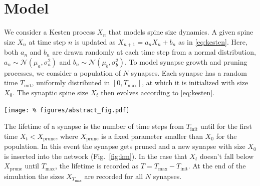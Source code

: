 
\section*{Model}
\vspace{-0.2cm}

We consider a Kesten process $X_n$ that models spine size dynamics. A given spine size $X_n$ at time step $n$ is updated as $X_{n+1} = a_n X_n + b_n$ as in \eqref{eq:kesten}. Here, both $a_n$ and $b_n$ are drawn randomly at each time step from a normal distribution, $a_n \sim \mathcal{N}(\mu_a, \sigma_a^2)$ and $b_n \sim \mathcal{N}(\mu_b, \sigma_b^2)$. To model synapse growth and pruning processes, we consider a population of $N$ synapses. Each synapse has a random time $T_{\mathrm{init}}$, uniformly distributed in $[0,T_{\text{max}}]$, at which it is initialized with size $X_0$. The synaptic spine size $X_t$ then evolves according to \eqref{eq:kesten}.

\begin{minipage}{\columnwidth}
  \begin{center}
    \vspace{0.75cm}
  \texttt{[image: \%
    figures/abstract\_fig.pdf]}
  \label{fig:km}
\end{center}
\end{minipage}

\columnbreak
The lifetime of a synapse is the number of time steps from $T_{\text{init}}$ until for the first time $X_t < X_{\mathrm{prune}}$, where $X_{\mathrm{prune}}$ is a fixed parameter smaller than $X_0$ for the population. In this event the synapse gets pruned and a new synapse with size $X_0$ is inserted into the network (Fig.~\ref{fig:km}). In the case that $X_t$ doesn't fall below $X_{\mathrm{prune}}$ until $T_{\text{max}}$, the lifetime is recorded as $T=T_{\text{max}}-T_{\text{init}}$. At the end of the simulation the sizes $X_{T_{\text{max}}}$ are recorded for all $N$ synapses.

